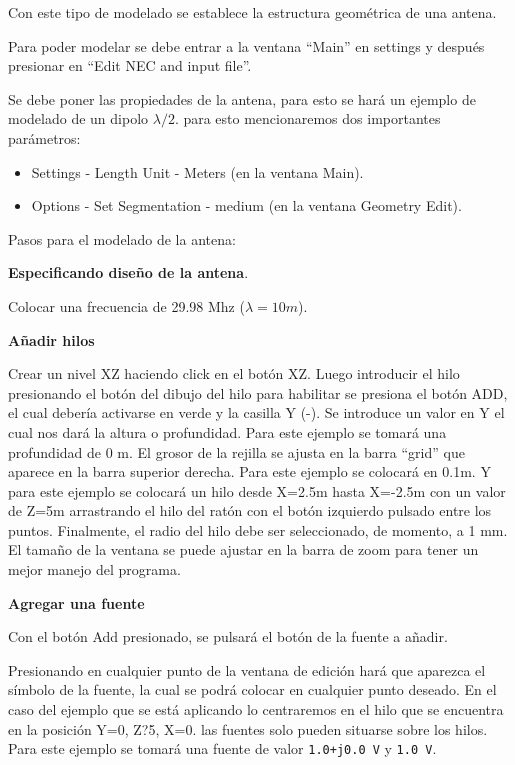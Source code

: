\documentclass[12pt]{article}
\begin{document}
Con este tipo de modelado se establece la estructura geométrica de una antena.

Para poder modelar se debe entrar a la ventana ``Main'' en settings y despu\'es
presionar en ``Edit NEC and input file''.

Se debe poner las propiedades de la antena, para esto se har\'a un ejemplo de
modelado de un dipolo \(\lambda/2\). para esto mencionaremos dos importantes
par\'ametros:

\begin{itemize}%
    \item Settings - Length Unit - Meters (en la ventana Main).
    \item Options - Set Segmentation - medium (en la ventana Geometry Edit).
\end{itemize}

Pasos para el modelado de la antena:

\textbf{Especificando diseño de la antena}.

Colocar una frecuencia de 29.98 Mhz (\(\lambda=10m\)).

\textbf{Añadir hilos} 

Crear un nivel XZ haciendo click en el bot\'on XZ. Luego introducir el hilo
presionando el bot\'on del dibujo del hilo para habilitar se presiona el
bot\'on ADD, el cual deber\'ia activarse en verde y la casilla Y (-). Se
introduce un valor en Y el cual nos dar\'a la altura o profundidad.  Para este
ejemplo se tomar\'a una profundidad de 0 m. El grosor de la rejilla se ajusta
en la barra ``grid'' que aparece en la barra superior derecha. Para este
ejemplo se colocar\'a en 0.1m. Y para este ejemplo se colocar\'a un hilo desde
X=2.5m hasta X=-2.5m con un valor de Z=5m arrastrando el hilo del rat\'on con
el bot\'on izquierdo pulsado entre los puntos. Finalmente, el radio del hilo
debe ser seleccionado, de momento, a 1 mm. El tamaño de la ventana se puede
ajustar en la barra de zoom para tener un mejor manejo del programa.

\textbf{Agregar una fuente}

Con el bot\'on Add presionado, se pulsar\'a el bot\'on de la fuente a añadir.

Presionando en cualquier punto de la ventana de edici\'on har\'a que aparezca el
s\'imbolo de la fuente, la cual se podr\'a colocar en cualquier punto deseado.
En el caso del ejemplo que se est\'a aplicando lo centraremos en el hilo que se
encuentra en la posici\'on Y=0, Z?5, X=0. las fuentes solo pueden situarse
sobre los hilos. Para este ejemplo se tomar\'a una fuente de valor
\texttt{1.0+j0.0 V} y \texttt{1.0 V}.
\end{document}
